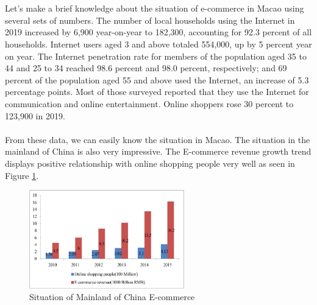 \documentclass{article}
\begin{document}
\\\\
Let's make a brief knowledge about the situation of e-commerce in Macao using several sets of numbers. The number of local households using the Internet in 2019 increased by 6,900 year-on-year to 182,300, accounting for 92.3 percent of all households.  Internet users aged 3 and above totaled 554,000, up by 5 percent year on year. The Internet penetration rate for members of the population aged 35 to 44 and 25 to 34 reached 98.6 percent and 98.0 percent, respectively; and 69 percent of the population aged 55 and above used the Internet, an increase of 5.3 percentage points. Most of those surveyed reported that they use the Internet for communication and online entertainment. Online shoppers rose 30 percent to 123,900 in 2019.\cite{macao}
\\\\
From these data, we can easily know the situation in Macao. The situation in the mainland of China is also very impressive. The E-commerce revenue growth trend displays positive relationship with online shopping people very well as seen in Figure \ref{fig:Mainland E-commerce}.
\begin{figure}[!htp]
    \centering
    \includegraphics[width=0.6\textwidth]{Mainland E-commerce.png}
    \caption{\label{fig:Mainland E-commerce}Situation of Mainland of China E-commerce\cite{sc}}
\end{figure}
\end{document}
